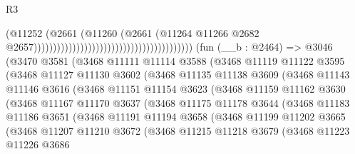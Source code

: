 \begin{lexlean}{R3}
\begin{coremodule}
                                                                            (@11252
                                                                              (@2661
                                                                                (@11260
                                                                                  (@2661
                                                                                    (@11264
                                                                                      @11266
                                                                                      @2682
                                                                                      @2657)))))))))))))))))))))))))))))))))))))))))
    (fun (__b : @2464) =>
    @3046
      (@3470
        @3581
        (@3468
          @11111
          @11114
          @3588
          (@3468
            @11119
            @11122
            @3595
            (@3468
              @11127
              @11130
              @3602
              (@3468
                @11135
                @11138
                @3609
                (@3468
                  @11143
                  @11146
                  @3616
                  (@3468
                    @11151
                    @11154
                    @3623
                    (@3468
                      @11159
                      @11162
                      @3630
                      (@3468
                        @11167
                        @11170
                        @3637
                        (@3468
                          @11175
                          @11178
                          @3644
                          (@3468
                            @11183
                            @11186
                            @3651
                            (@3468
                              @11191
                              @11194
                              @3658
                              (@3468
                                @11199
                                @11202
                                @3665
                                (@3468
                                  @11207
                                  @11210
                                  @3672
                                  (@3468
                                    @11215
                                    @11218
                                    @3679
                                    (@3468
                                      @11223
                                      @11226
                                      @3686

\end{coremodule}
\end{lexlean}
